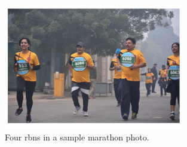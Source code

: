 \newpage
\begin{figure}[h!]
  \centering
  \includegraphics[width=0.7\textwidth]{images/introduction/rbn}
  \caption[Sample racing bib numbers]{Four \glspl{rbn} in a sample marathon photo.}
  \label{fig:introduction:background:sample_rbns}
\end{figure}
\vspace{\fill}
